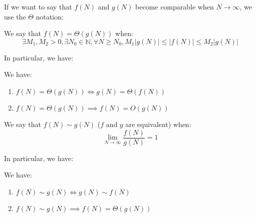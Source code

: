 If we want to say that $f(N)$ and $g(N)$ become comparable when $N \rightarrow \infty$, we use the $\Theta$ notation:
\begin{definition}
    We say that $f(N) = \Theta(g(N))$ when:
\begin{equation}
    \exists M_1, M_2 > 0, \exists N_0 \in \mathbb{N}, \forall N \ge N_0, M_1 |g(N)| \le |f(N)| \le M_2 |g(N)|
\end{equation}
\end{definition}

In particular, we have:

\begin{theorem}
    We have: 
    \begin{enumerate}
        \item $f(N) = \Theta(g(N)) \iff g(N) = \Theta(f(N))$
        \item $f(N) = \Theta(g(N)) \implies f(N) = O(g(N))$
    \end{enumerate}
\end{theorem}

\begin{definition}[Equivalence]
    We say that $f(N) \sim g(N)$ ($f$ and $g$ are equivalent) when:
    \begin{equation}
        \lim_{N \rightarrow \infty} \frac{f(N)}{g(N)} = 1
    \end{equation}
\end{definition}

In particular, we have:

\begin{theorem}
    We have:
    \begin{enumerate}
        \item $f(N) \sim g(N) \iff g(N) \sim f(N)$
        \item $f(N) \sim g(N) \implies f(N) = \Theta(g(N))$
    \end{enumerate}
\end{theorem}
